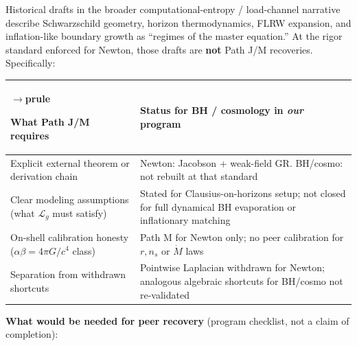 \documentclass[
  11pt,
]{article}
\newcounter{none} %
\begin{document}
Historical drafts in the broader computational-entropy / load-channel narrative describe Schwarzschild geometry, horizon thermodynamics, FLRW expansion, and inflation-like boundary growth as ``regimes of the master equation.'' At the rigor standard enforced for Newton, those drafts are \textbf{not} Path J/M recoveries. Specifically:

{\def\LTcaptype{none} %
\begin{longtable}[]{@{}
  >{\raggedright\arraybackslash}p{}
  >{\raggedright\arraybackslash}p{}@{}}
$\rightarrow$prule\noalign{}
\begin{minipage}[b]{\linewidth}\raggedright
What Path J/M requires
\end{minipage} & \begin{minipage}[b]{\linewidth}\raggedright
Status for BH / cosmology in \emph{our} program
\end{minipage} \\
\midrule\noalign{}
\endhead
\bottomrule\noalign{}
\endlastfoot
Explicit external theorem or derivation chain & Newton: Jacobson + weak-field GR. BH/cosmo: not rebuilt at that standard \\
Clear modeling assumptions (what \(\mathcal{L}_g\) must satisfy) & Stated for Clausius-on-horizons setup; not closed for full dynamical BH evaporation or inflationary matching \\
On-shell calibration honesty (\(\alpha\beta=4\pi G/c^4\) class) & Path M for Newton only; no peer calibration for \(r,n_s\) or \(\dot M\) laws \\
Separation from withdrawn shortcuts & Pointwise Laplacian withdrawn for Newton; analogous algebraic shortcuts for BH/cosmo not re-validated \\
\end{longtable}
}

\textbf{What would be needed for peer recovery} (program checklist, not a claim of completion):
\end{document}
